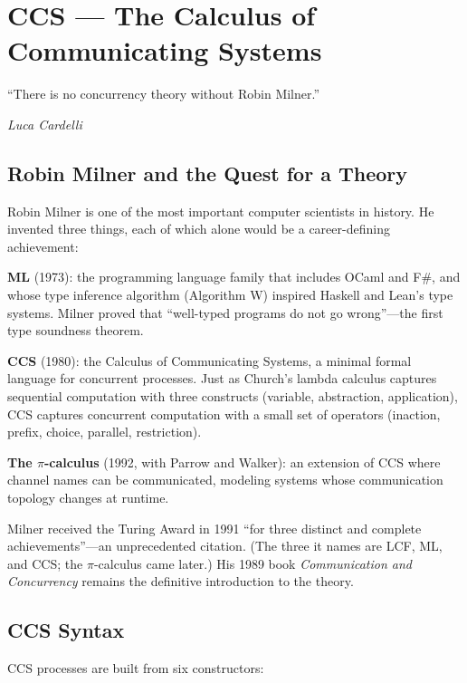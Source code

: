 \documentclass[11pt, a4paper, oneside]{book}
\begin{document}
\chapter{CCS --- The Calculus of Communicating Systems}

\epigraph{``There is no concurrency theory without Robin Milner.''}%
{\textit{Luca Cardelli}}

\section{Robin Milner and the Quest for a Theory}

\begin{historical}[title={Robin Milner (1934--2010)}]
Robin Milner is one of the most important computer scientists in history. He
invented three things, each of which alone would be a career-defining
achievement:

\textbf{ML} (1973): the programming language family that includes OCaml and
F\#, and whose type inference algorithm (Algorithm W) inspired Haskell and
Lean's type systems. Milner proved that ``well-typed programs do not go
wrong''---the first type soundness theorem.

\textbf{CCS} (1980): the Calculus of Communicating Systems, a minimal formal
language for concurrent processes. Just as Church's lambda calculus captures
sequential computation with three constructs (variable, abstraction,
application), CCS captures concurrent computation with a small set of
operators (inaction, prefix, choice, parallel, restriction).

\textbf{The $\pi$-calculus} (1992, with Parrow and Walker): an extension of
CCS where channel names can be communicated, modeling systems whose
communication topology changes at runtime.

Milner received the Turing Award in 1991 ``for three distinct and complete
achievements''---an unprecedented citation. (The three it names are LCF, ML,
and CCS; the $\pi$-calculus came later.) His 1989 book
\textit{Communication and Concurrency} remains the definitive introduction
to the theory.
\end{historical}

\section{CCS Syntax}

CCS processes are built from six constructors:
\end{document}
